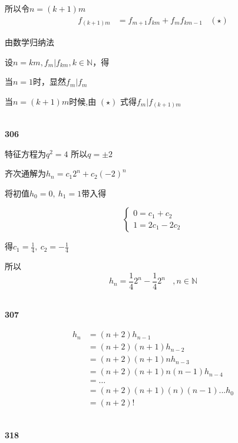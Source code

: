 \documentclass[UTF8]{ctexart}
\begin{document}
    所以令$n=(k+1)m$
    \begin{equation*}
        \begin{aligned}
            f_{(k+1)m}
            &=f_{m+1}f_{km}+f_{m}f_{km-1}~~~~(\star)
        \end{aligned}
    \end{equation*}

    由数学归纳法

    设$n=km, f_m|f_{km}, k\in \mathbb{N} $，得

    当$n=1$时，显然$f_m|f_m$

    当$n=(k+1)m$时候,由 $(\star)$ 式得$f_m|f_{(k+1)m}$

    ~\\
    \noindent\textbf{306}

    特征方程为$q^2=4$ 所以$q=\pm 2$

    齐次通解为$h_n=c_1 2^n+c_2 (-2)^n$
    
    将初值$h_0=0,~h_1=1$带入得

    \begin{equation*}
        \begin{cases}
            0=c_1+c_2\\
            1=2c_1-2c_2
        \end{cases}
    \end{equation*}

    得$c_1=\frac{1}{4},~c_2=-\frac{1}{4}$

    所以
    $$
    h_n=\frac{1}{4}2^n-\frac{1}{4}2^n~~~~,n \in \mathbb{N} 
    $$

    ~\\
    \noindent\textbf{307}

    \begin{equation*}
        \begin{aligned}
            h_n
            &=(n+2)h_{n-1}\\
            &=(n+2)(n+1)h_{n-2}\\
            &=(n+2)(n+1)nh_{n-3}\\
            &=(n+2)(n+1)n(n-1)h_{n-4}\\
            &=\dots\\
            &=(n+2)(n+1)(n)(n-1)...h_0 \\
            &=(n+2)!
        \end{aligned}
    \end{equation*}

    ~\\
    \noindent\textbf{318}
\end{document}
